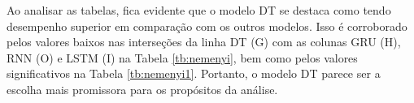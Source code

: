 Ao analisar as tabelas, fica evidente que o modelo DT se destaca como tendo desempenho superior em comparação com os outros modelos. Isso é corroborado pelos valores baixos nas interseções da linha DT (G) com as colunas GRU (H), RNN (O) e LSTM (I) na Tabela \ref{tb:nemenyi}, bem como pelos valores significativos na Tabela \ref{tb:nemenyi1}. Portanto, o modelo DT parece ser a escolha mais promissora para os propósitos da análise.

%
%
%


